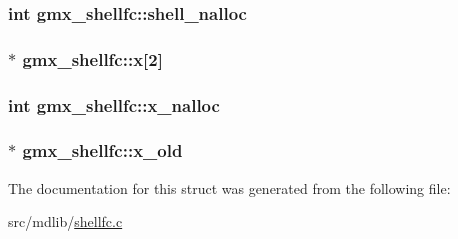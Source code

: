 \hypertarget{structgmx__shellfc_ac3c11731d8096158b22d2330e2453c38}{
\subsubsection[{shell\-\_\-nalloc}]{\setlength{\rightskip}{0pt plus 5cm}int {\bf gmx\-\_\-shellfc\-::shell\-\_\-nalloc}}}\label{structgmx__shellfc_ac3c11731d8096158b22d2330e2453c38}
\hypertarget{structgmx__shellfc_ab09555249187ef47ffb3db5deec2e37e}{
\subsubsection[{x}]{$\ast$ {\bf gmx\-\_\-shellfc\-::x}\mbox{[}2\mbox{]}}}\label{structgmx__shellfc_ab09555249187ef47ffb3db5deec2e37e}
\hypertarget{structgmx__shellfc_a86f551afa12c97e0690735150abd1e7e}{
\subsubsection[{x\-\_\-nalloc}]{\setlength{\rightskip}{0pt plus 5cm}int {\bf gmx\-\_\-shellfc\-::x\-\_\-nalloc}}}\label{structgmx__shellfc_a86f551afa12c97e0690735150abd1e7e}
\hypertarget{structgmx__shellfc_a9fa05bbb3a3cd7471d0fd0ece1d93997}{
\subsubsection[{x\-\_\-old}]{$\ast$ {\bf gmx\-\_\-shellfc\-::x\-\_\-old}}}\label{structgmx__shellfc_a9fa05bbb3a3cd7471d0fd0ece1d93997}


\-The documentation for this struct was generated from the following file\-:\begin{DoxyCompactItemize}
\item 
src/mdlib/\hyperlink{shellfc_8c}{shellfc.\-c}\end{DoxyCompactItemize}
